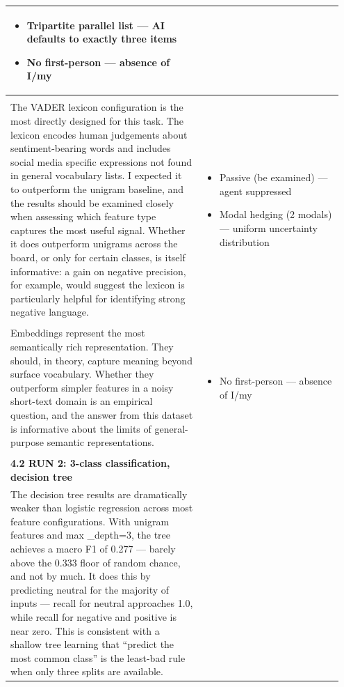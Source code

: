 \documentclass[11pt]{article}
\begin{document}
\begin{longtable}{|p{0.55\linewidth}|p{0.40\linewidth}|}
\begin{itemize}[leftmargin=1em,itemsep=1pt,topsep=1pt,parsep=0pt]
  \item Tripartite parallel list --- AI defaults to exactly three items
  \item No first-person --- absence of I/my
\end{itemize} \\[2pt]
\hline
\rule{0pt}{3.5cm} & \\
\hline
The VADER lexicon configuration is the most directly designed for this task. The lexicon encodes human judgements about sentiment-bearing words and includes social media specific expressions not found in general vocabulary lists. I expected it to outperform the unigram baseline, and the results should be examined closely when assessing which feature type captures the most useful signal. Whether it does outperform unigrams across the board, or only for certain classes, is itself informative: a gain on negative precision, for example, would suggest the lexicon is particularly helpful for identifying strong negative language. & \begin{itemize}[leftmargin=1em,itemsep=1pt,topsep=1pt,parsep=0pt]
  \item Passive (be examined) --- agent suppressed
  \item Modal hedging (2 modals) --- uniform uncertainty distribution
\end{itemize} \\[2pt]
\hline
\rule{0pt}{3.5cm} & \\
\hline
Embeddings represent the most semantically rich representation. They should, in theory, capture meaning beyond surface vocabulary. Whether they outperform simpler features in a noisy short-text domain is an empirical question, and the answer from this dataset is informative about the limits of general-purpose semantic representations. & \begin{itemize}[leftmargin=1em,itemsep=1pt,topsep=1pt,parsep=0pt]
  \item No first-person --- absence of I/my
\end{itemize} \\[2pt]
\hline
\rule{0pt}{3.5cm} & \\
\hline
\textbf{4.2 RUN 2: 3-class classification, decision tree}\\[4pt]
The decision tree results are dramatically weaker than logistic regression across most feature configurations. With unigram features and max \_depth=3, the tree achieves a macro F1 of 0.277 --- barely above the 0.333 floor of random chance, and not by much. It does this by predicting neutral for the majority of inputs --- recall for neutral approaches 1.0, while recall for negative and positive is near zero. This is consistent with a shallow tree learning that ``predict the most common class'' is the least-bad rule when only three splits are available. & \begin{itemize}[leftmargin=1em,itemsep=1pt,topsep=1pt,parsep=0pt]

\end{itemize}
\end{longtable}
\end{document}
